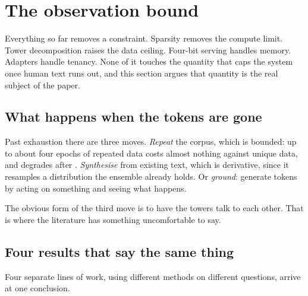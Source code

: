 \documentclass[11pt]{article}
\begin{document}
\section{The observation bound}
\label{sec:observation}

Everything so far removes a constraint. Sparsity removes the compute limit. Tower decomposition raises the data ceiling. Four-bit serving handles memory. Adapters handle tenancy. None of it touches the quantity that caps the system once human text runs out, and this section argues that quantity is the real subject of the paper.

\subsection{What happens when the tokens are gone}

Past exhaustion there are three moves. \emph{Repeat} the corpus, which is bounded: up to about four epochs of repeated data costs almost nothing against unique data, and degrades after \cite{muennighoff2023}. \emph{Synthesise} from existing text, which is derivative, since it resamples a distribution the ensemble already holds. Or \emph{ground}: generate tokens by acting on something and seeing what happens.

The obvious form of the third move is to have the towers talk to each other. That is where the literature has something uncomfortable to say.

\subsection{Four results that say the same thing}

Four separate lines of work, using different methods on different questions, arrive at one conclusion.
\end{document}

